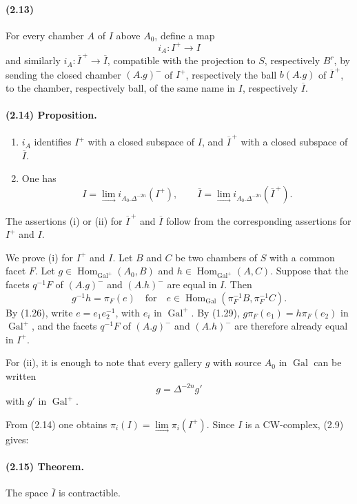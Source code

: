 \documentclass[10pt]{article}
\providecommand{\varinjlim}{\mathop{\mathrm{lim}}\limits_{\longrightarrow}}
\begin{document}
\paragraph{(2.13)} For every chamber \(A\) of \(I\) above \(A_0\), define a map
\[
i_A:I^+\longrightarrow I
\]
and similarly \(i_A:\overline I^{\, +}\to\overline I\), compatible with the projection to \(S\), respectively \(B^r\), by sending the closed chamber \((A.g)^{-}\) of \(I^+\), respectively the ball \(b(A.g)\) of \(\overline I^{\, +}\), to the chamber, respectively ball, of the same name in \(I\), respectively \(\overline I\).

\paragraph{(2.14) Proposition.}
\begin{enumerate}[label=(\roman*)]
\item \(i_A\) identifies \(I^+\) with a closed subspace of \(I\), and \(\overline I^{\, +}\) with a closed subspace of \(\overline I\).
\item One has
\[
I=\varinjlim i_{A_0.\Delta^{-2n}}(I^+),
\qquad
\overline I=\varinjlim i_{A_0.\Delta^{-2n}}(\overline I^{\, +}).
\]
\end{enumerate}
The assertions (i) or (ii) for \(\overline I^{\, +}\) and \(\overline I\) follow from the corresponding assertions for \(I^+\) and \(I\).

We prove (i) for \(I^+\) and \(I\). Let \(B\) and \(C\) be two chambers of \(S\) with a common facet \(F\). Let \(g\in\operatorname{Hom}_{\operatorname{Gal}^+}(A_0,B)\) and \(h\in\operatorname{Hom}_{\operatorname{Gal}^+}(A,C)\). Suppose that the facets \(q^{-1}F\) of \((A.g)^{-}\) and \((A.h)^{-}\) are equal in \(I\). Then
\[
g^{-1}h=\pi_F(e)
\quad\text{for}\quad
e\in\operatorname{Hom}_{\operatorname{Gal}}(\pi_F^{-1}B,\pi_F^{-1}C).
\]
By (1.26), write \(e=e_1e_2^{-1}\), with \(e_i\) in \(\operatorname{Gal}^+\). By (1.29), \(g\pi_F(e_1)=h\pi_F(e_2)\) in \(\operatorname{Gal}^+\), and the facets \(q^{-1}F\) of \((A.g)^{-}\) and \((A.h)^{-}\) are therefore already equal in \(I^+\).

For (ii), it is enough to note that every gallery \(g\) with source \(A_0\) in \(\operatorname{Gal}\) can be written
\[
g=\Delta^{-2n}g'
\]
with \(g'\) in \(\operatorname{Gal}^+\).

From (2.14) one obtains \(\pi_i(I)=\varinjlim\pi_i(I^+)\). Since \(I\) is a CW-complex, (2.9) gives:

\paragraph{(2.15) Theorem.} The space \(\overline I\) is contractible.
\end{document}
